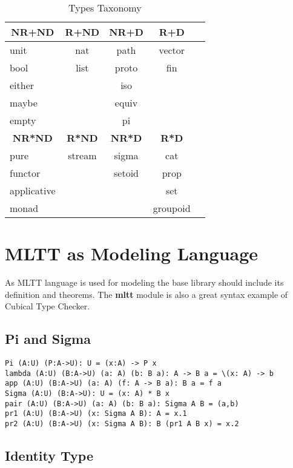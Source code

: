 \documentclass{article}
\newcommand*{\thead}[1]{\multicolumn{1}{c}{\bfseries #1}}
\begin{document}
\begin{table}[h]
\centering
\caption{Types Taxonomy}
\label{tab:a}
\begin{tabular}{lcccc}
\hline
\thead{NR+ND} & \thead{R+ND} & \thead{NR+D} & \thead{R+D}\\
\hline
unit        & nat    & path    & vector \\
bool        & list   & proto   & fin \\
either      &        & iso     &  \\
maybe       &        & equiv   &  \\
empty       &        & pi       &  \\
\hline
\thead{NR*ND} & \thead{R*ND} & \thead{NR*D} & \thead{R*D}\\
\hline
pure        & stream & sigma   & cat  \\
functor     &        & setoid  & prop \\
applicative &        &         & set  \\
monad       &        &         & groupoid \\
\end{tabular}
\end{table}

\section{MLTT as Modeling Language}

As MLTT language is used for modeling the base library should include its definition and theorems.
The {\bf mltt} module is also a great syntax example of Cubical Type Checker.

\subsection{Pi and Sigma}

\begin{lstlisting}[mathescape=true]
Pi (A:U) (P:A->U): U = (x:A) -> P x
lambda (A:U) (B:A->U) (a: A) (b: B a): A -> B a = \(x: A) -> b
app (A:U) (B:A->U) (a: A) (f: A -> B a): B a = f a
Sigma (A:U) (B:A->U): U = (x: A) * B x
pair (A:U) (B:A->U) (a: A) (b: B a): Sigma A B = (a,b)
pr1 (A:U) (B:A->U) (x: Sigma A B): A = x.1
pr2 (A:U) (B:A->U) (x: Sigma A B): B (pr1 A B x) = x.2
\end{lstlisting}

\subsection{Identity Type}
\end{document}
